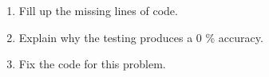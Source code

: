 \documentclass[12pt]{article}
\begin{document}
\maketitle
\begin{enumerate}
  \item Fill up the missing lines of code.
  \item Explain why the testing produces a 0 \% accuracy.
  \item Fix the code for this problem.
\end{enumerate}
\end{document}
